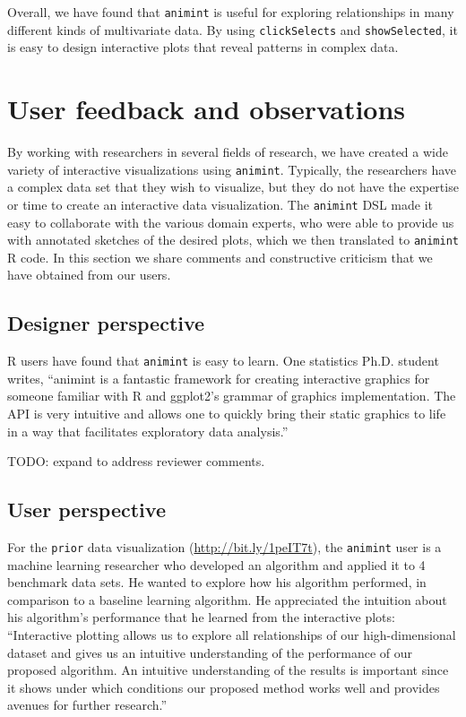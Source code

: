 \documentclass[journal]{vgtc}\usepackage[]{graphicx}\usepackage[]{color}
\begin{document}
Overall, we have found that \texttt{animint} is useful for exploring
relationships in many different kinds of multivariate data. By using
\texttt{clickSelects} and \texttt{showSelected}, it is easy to design
interactive plots that reveal patterns in complex data.

\section{User feedback and observations}

By working with researchers in several fields of research,
we have created a wide variety of
interactive visualizations using \texttt{animint}.
Typically, the researchers have a complex data set that
they wish to visualize,
but they do not have the expertise or time to create
an interactive data visualization.
The \texttt{animint} DSL made it easy to collaborate with the various domain experts,
who were able to provide us with annotated sketches of the desired plots,
which we then translated to \texttt{animint} R code.
In this section we share comments and
constructive criticism that we have obtained from our users.

\subsection{Designer perspective}

R users have found that \texttt{animint} is easy to learn. One statistics
Ph.D. student writes, ``animint is a fantastic framework for creating
interactive graphics for someone familiar with R and ggplot2's grammar
of graphics implementation. The API is very intuitive and allows one
to quickly bring their static graphics to life in a way that
facilitates exploratory data analysis.''

TODO: expand to address reviewer comments.

\subsection{User perspective}

For the \texttt{prior} data visualization
(\url{http://bit.ly/1peIT7t}), the \texttt{animint} user is a machine learning
researcher who developed an algorithm and applied it to 4 benchmark
data sets. He wanted to explore how his algorithm performed, in
comparison to a baseline learning algorithm. He appreciated the
intuition about his algorithm's performance that he learned from the
interactive plots: ``Interactive plotting allows us to explore all
relationships of our high-dimensional dataset and gives us an
intuitive understanding of the performance of our proposed
algorithm. An intuitive understanding of the results is important
since it shows under which conditions our proposed method works well
and provides avenues for further research.''
\end{document}

